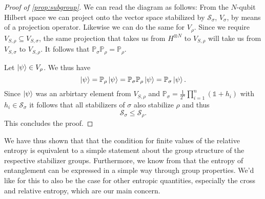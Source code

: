 \begin{proof}[Proof of \cref{prop:subgroup}]
  We can read the diagram as follows: From the $N$-qubit Hilbert space we can
  project onto the vector space stabilized by $\mathcal{S}_\sigma$, $V_\sigma$, by means of a
  projection operator. Likewise we can do the same for $V_\rho$. Since we
  require $V_{S,\rho} \subseteq V_{S,\sigma}$, the same projection that takes
  us from $H^{\otimes N}$ to $V_{S,\rho}$ will take us from $V_{S,\sigma}$ to
  $V_{S,\rho}$. It follows that $\mathbb{P}_\sigma \mathbb{P}_\rho = \mathbb{P}_\rho$.

  Let $\ket{\psi} \in V_\rho$. We thus have
  \[
    \ket{\psi} = \mathbb{P}_\rho \ket{\psi} = \mathbb{P}_\sigma \mathbb{P}_\rho
    \ket{\psi} = \mathbb{P}_\sigma
    \ket{\psi}.
  \]
  Since $\ket{\psi}$ was an arbirtary element from $V_{S,\rho}$ and $\mathbb{P}_\sigma =
  \frac{1}{2^n} \prod_{i=1}^n \left(\mathds{1} + h_i\right)$ with $h_i \in
  \mathcal{S}_\sigma$ it follows that all stabilizers of $\sigma$ also stabilize $\rho$
  and thus
  \[
    \mathcal{S}_\sigma \leq \mathcal{S}_\rho.
  \]
  This concludes the proof.
\end{proof}
We have thus shown that that the condition for finite values of the relative
entropy is equivalent to a simple statement about the group structure of the
respective stabilizer groups. Furthermore, we know from 
\cite{fattalEntanglementStabilizerFormalism2004} that the entropy of
entanglement can be expressed in a simple way through group properties.
We'd like for this to also be the case for other entropic quantities,
especially the cross and relative entropy, which are our main concern.

